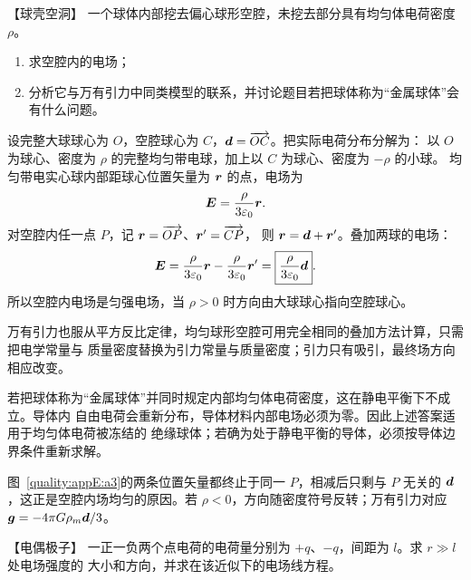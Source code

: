 \begin{origexamplebox}{【球壳空洞】}\label{appE:ex:s18-29-3}
一个球体内部挖去偏心球形空腔，未挖去部分具有均匀体电荷密度 $\rho$。
\begin{enumerate}[label=(\arabic*),leftmargin=2.2em]
  \item 求空腔内的电场；
  \item 分析它与万有引力中同类模型的联系，并讨论题目若把球体称为“金属球体”会有什么问题。
\end{enumerate}
\end{origexamplebox}

\begin{xesolution}
设完整大球球心为 $O$，空腔球心为 $C$，$\bm{d}=\overrightarrow{OC}$。把实际电荷分布分解为：
以 $O$ 为球心、密度为 $\rho$ 的完整均匀带电球，加上以 $C$ 为球心、密度为 $-\rho$ 的小球。
均匀带电实心球内部距球心位置矢量为 $\bm{r}$ 的点，电场为
\[
  \bm{E}=\frac{\rho}{3\varepsilon_0}\bm{r}.
\]
对空腔内任一点 $P$，记 $\bm{r}=\overrightarrow{OP}$、$\bm{r}'=\overrightarrow{CP}$，
则 $\bm{r}=\bm{d}+\bm{r}'$。叠加两球的电场：
\[
  \bm{E}=\frac{\rho}{3\varepsilon_0}\bm{r}
  -\frac{\rho}{3\varepsilon_0}\bm{r}'
  =\boxed{\frac{\rho}{3\varepsilon_0}\bm{d}}.
\]
所以空腔内电场是匀强电场，当 $\rho>0$ 时方向由大球球心指向空腔球心。

万有引力也服从平方反比定律，均匀球形空腔可用完全相同的叠加方法计算，只需把电学常量与
质量密度替换为引力常量与质量密度；引力只有吸引，最终场方向相应改变。

若把球体称为“金属球体”并同时规定内部均匀体电荷密度，这在静电平衡下不成立。导体内
自由电荷会重新分布，导体材料内部电场必须为零。因此上述答案适用于均匀体电荷被冻结的
绝缘球体；若确为处于静电平衡的导体，必须按导体边界条件重新求解。


图~\ref{quality:appE:a3}的两条位置矢量都终止于同一 $P$，相减后只剩与 $P$ 无关的 $\bm{d}$，这正是空腔内场均匀的原因。若 $\rho<0$，方向随密度符号反转；万有引力对应 $\bm{g}=-4\pi G\rho_m\bm{d}/3$。
\end{xesolution}

\begin{origexamplebox}{【电偶极子】}\label{appE:ex:s18-29-4}
一正一负两个点电荷的电荷量分别为 $+q$、$-q$，间距为 $l$。求 $r\gg l$ 处电场强度的
大小和方向，并求在该近似下的电场线方程。
\end{origexamplebox}


